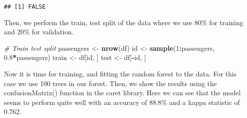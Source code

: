 \documentclass[
]{article}
\newenvironment{Shaded}{\begin{snugshade}}{\end{snugshade}}
\newcommand{\AttributeTok}[1]{\textcolor[rgb]{0.13,0.29,0.53}{#1}}
\newcommand{\CommentTok}[1]{\textcolor[rgb]{0.56,0.35,0.01}{\textit{#1}}}
\newcommand{\DecValTok}[1]{\textcolor[rgb]{0.00,0.00,0.81}{#1}}
\newcommand{\FloatTok}[1]{\textcolor[rgb]{0.00,0.00,0.81}{#1}}
\newcommand{\FunctionTok}[1]{\textcolor[rgb]{0.13,0.29,0.53}{\textbf{#1}}}
\newcommand{\NormalTok}[1]{#1}
\newcommand{\OtherTok}[1]{\textcolor[rgb]{0.56,0.35,0.01}{#1}}
\newcommand{\SpecialCharTok}[1]{\textcolor[rgb]{0.81,0.36,0.00}{\textbf{#1}}}
\begin{document}
\begin{verbatim}
## [1] FALSE
\end{verbatim}

Then, we perform the train, test split of the data where we use 80\% for
training and 20\% for validation.

\begin{Shaded}
\begin{Highlighting}[]
\CommentTok{\# Train test split}
\NormalTok{passengers }\OtherTok{\textless{}{-}} \FunctionTok{nrow}\NormalTok{(df)}
\NormalTok{id }\OtherTok{\textless{}{-}} \FunctionTok{sample}\NormalTok{(}\DecValTok{1}\SpecialCharTok{:}\NormalTok{passengers, }\FloatTok{0.8}\SpecialCharTok{*}\NormalTok{passengers)}
\NormalTok{train }\OtherTok{\textless{}{-}}\NormalTok{ df[id, ]}
\NormalTok{test }\OtherTok{\textless{}{-}}\NormalTok{ df[}\SpecialCharTok{{-}}\NormalTok{id, ]}
\end{Highlighting}
\end{Shaded}

Now it is time for training, and fitting the random forest to the data.
For this case we use 100 trees in our forest. Then, we show the results
using the confusionMatrix() function in the caret library. Here we can
see that the model seems to perform quite well with an accuracy of
88.8\% and a kappa statistic of \(0.762\).

\begin{Shaded}
\end{Shaded}
\end{document}
